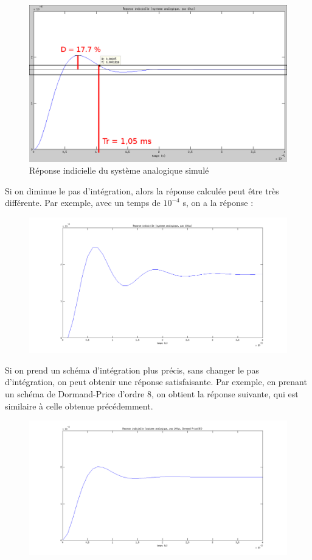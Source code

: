 \documentclass[../../Cours_M1.tex]{subfiles}
\begin{document}
\begin{figure}[h!]
\centering
\includegraphics[scale=0.4]{analtr5.png}
\caption{Réponse indicielle du système analogique simulé}
\end{figure}

Si on diminue le pas d'intégration, alors la réponse calculée peut être très différente. Par exemple, avec un temps de $10^{-4}$ s, on a la réponse :

\begin{figure}[h!]
\centering
\includegraphics[scale=0.4]{analbullshit.png}
\end{figure}

Si on prend un schéma d'intégration plus précis, sans changer le pas d'intégration, on peut obtenir une réponse satisfaisante. Par exemple, en prenant un schéma de Dormand-Price d'ordre 8, on obtient la réponse suivante, qui est similaire à celle obtenue précédemment.

\begin{figure}[h!]
\centering
\includegraphics[scale=0.4]{anal_DP8.png}
\end{figure}
\end{document}
